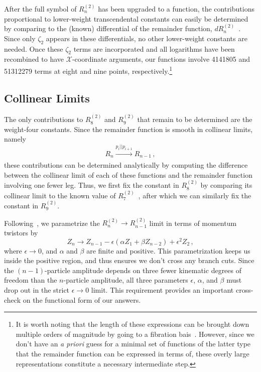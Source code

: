 \documentclass[11pt]{article}
\def\x{\mathcal{X}}
\begin{document}
After the full symbol of $R_n^{(2)}$\! has been upgraded to a function, the contributions proportional to lower-weight transcendental constants can easily be determined by comparing to the (known) differential of the remainder function, $dR_n^{(2)}$\!~\cite{CaronHuot:2011ky,Golden:2013lha}. Since only $\zeta_2$ appears in these differentials, no other lower-weight constants are needed. Once these $\zeta_2$ terms are incorporated and all logarithms have been recombined to have $\x$-coordinate arguments, our functions involve 4141805 and 51312279 terms at eight and nine points, respectively.\footnote{It is worth noting that the length of these expressions can be brought down multiple orders of magnitude by going to a fibration bais~\cite{Brown:2009qja}. However, since we don't have an \emph{a priori} guess for a minimal set of functions of the latter type that the remainder function can be expressed in terms of, these overly large representations constitute a necessary intermediate step.}

\subsection{Collinear Limits}
\label{sec:collinear_limits}

The only contributions to $R_8^{(2)}$\! and $R_9^{(2)}$\! that remain to be determined are the weight-four constants. Since the remainder function is smooth in collinear limits, namely
\begin{equation} \label{eq:remainder_smooth_collinear_limits}
R_n \xrightarrow[]{p_i || p_{i+1}} R_{n-1} \, ,
\end{equation} 
these contributions can be determined analytically by computing the difference between the collinear limit of each of these functions and the remainder function involving one fewer leg. Thus, we first fix the constant in $R_8^{(2)}$\! by comparing its collinear limit to the known value of $R_7^{(2)}$\!~\cite{Golden:2014xqf}, after which we can similarly fix the constant in $R_9^{(2)}$\!. 


Following~\cite{CaronHuot:2011ky}, we parametrize the $R_n^{(2)} \to R_{n-1}^{(2)}$ limit in terms of momentum twistors by
\begin{equation} \label{eq:collinear_parametrization}
Z_n \to Z_{n-1} - \epsilon (\alpha Z_1 + \beta Z_{n-2}) + \epsilon^2 Z_2 \, ,
\end{equation}
where $\epsilon \to 0$, and $\alpha$ and $\beta$ are finite and positive. This parametrization keeps us inside the positive region, and thus ensures we don't cross any branch cuts. Since the $(n{-}1)$-particle amplitude depends on three fewer kinematic degrees of freedom than the $n$-particle amplitude, all three parameters $\epsilon$, $\alpha$, and $\beta$ must drop out in the strict $\epsilon \to 0$ limit. This requirement provides an important cross-check on the functional form of our answers.
\end{document}
